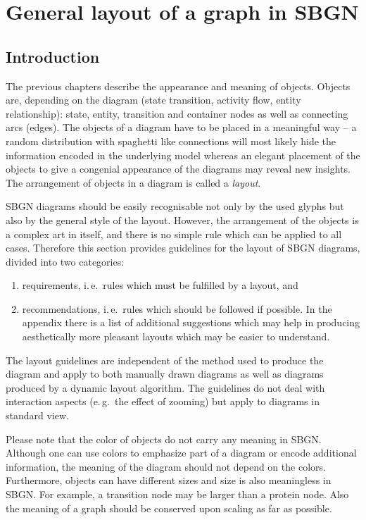 \chapter{General layout of a graph in SBGN}
\label{chp:layout}

\section{Introduction}

The previous chapters describe the appearance and meaning of
objects. Objects are, depending on the diagram (state transition,
activity flow, entity relationship): state, entity, transition and
container nodes as well as connecting arcs (edges). The objects of a
diagram have to be placed in a meaningful way -- a random
distribution with spaghetti like connections will most likely hide
the information encoded in the underlying model whereas an elegant
placement of the objects to give a congenial appearance of the
diagrams may reveal new insights. The arrangement of objects in a
diagram is called a \emph{layout}.

SBGN diagrams should be easily recognisable not only by the used
glyphs but also by the general style of the layout. However, the
arrangement of the objects is a complex art in itself, and there is
no simple rule which can be applied to all cases. Therefore this
section provides guidelines for the layout of SBGN diagrams, divided
into two categories:
\begin{enumerate}
  \item requirements, i.\,e.~rules which must be fulfilled by a
  layout, and
  \item recommendations, i.\,e.~rules which should be followed if
  possible. In the appendix there is a list of additional suggestions
  which may help in producing aesthetically more pleasant layouts
  which may be easier to understand.
\end{enumerate}

The layout guidelines are independent of the method used to produce
the diagram and apply to both manually drawn diagrams as well as
diagrams produced by a dynamic layout algorithm. The guidelines do
not deal with interaction aspects (e.\,g.~the effect of zooming) but
apply to diagrams in standard view.

Please note that the color of objects do not carry any meaning in
SBGN. Although one can use colors to emphasize part of a diagram or
encode additional information, the meaning of the diagram should not
depend on the colors. Furthermore, objects can have different sizes
and size is also meaningless in SBGN. For example, a transition node
may be larger than a protein node. Also the meaning of a graph
should be conserved upon scaling as far as possible.

